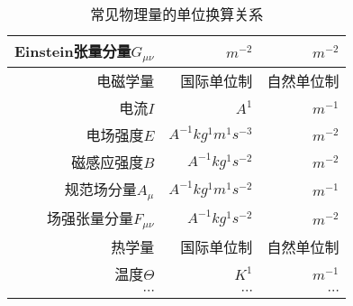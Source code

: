 \begin{table}[!htbp]
\begin{tabular*}{\hsize}{@{}@{\extracolsep{\fill}}rrr@{}}
			Einstein张量分量$G_{\mu\nu}$	&	$m^{-2}$								&	$m^{-2}$					\\
			\midrule
			电磁学量						&				国际单位制					&	自然单位制	\\
			\midrule
			电流$I$							&	$A^{1}$									&	 $m^{-1}$					\\
			电场强度$E$						&	$A^{-1}kg^{1}m^{1}s^{-3}$				&	 $m^{-2}$					\\
			磁感应强度$B$					&	$A^{-1}kg^{1}s^{-2}$					&	 $m^{-2}$					\\
			规范场分量$A_\mu$					&	$A^{-1}kg^{1}m^{1}s^{-2}$				&	 $m^{-1}$					\\
			场强张量分量$F_{\mu\nu}$		&	$A^{-1}kg^{1}s^{-2}$					&	 $m^{-2}$					\\
			\midrule
			热学量							&				国际单位制					&	自然单位制	\\
			\midrule
			温度$\varTheta$					&	$K^{1}$									&	 $m^{-1}$					\\
			$\cdots$						&	$\cdots$								&	 $\cdots$					\\




					
			\bottomrule
		\end{tabular*}
		\caption{常见物理量的单位换算关系}\label{tab:Dimensional}
		\end{table}